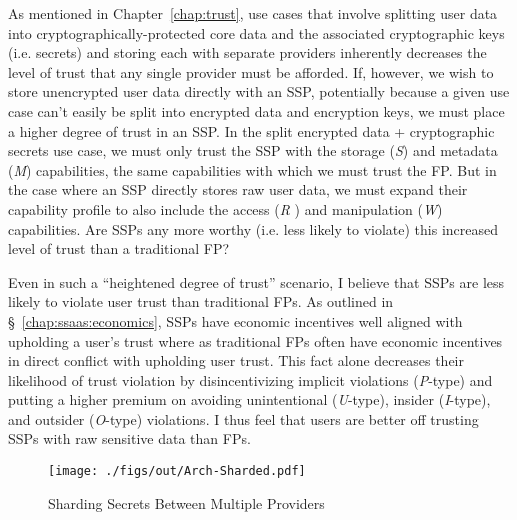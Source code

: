 As mentioned in Chapter~\ref{chap:trust}, use cases that involve
splitting user data into cryptographically-protected core data and the
associated cryptographic keys (i.e. secrets) and storing each with
separate providers inherently decreases the level of trust that any
single provider must be afforded. If, however, we wish to store
unencrypted user data directly with an SSP, potentially because a
given use case can't easily be split into encrypted data and
encryption keys, we must place a higher degree of trust in an SSP. In
the split encrypted data + cryptographic secrets use case, we must
only trust the SSP with the storage (\emph{S}) and metadata (\emph{M})
capabilities, the same capabilities with which we must trust the
FP. But in the case where an SSP directly stores raw user data, we
must expand their capability profile to also include the access
(\emph{R} ) and manipulation (\emph{W}) capabilities. Are SSPs any
more worthy (i.e. less likely to violate) this increased level of
trust than a traditional FP?

Even in such a ``heightened degree of trust'' scenario, I believe that
SSPs are less likely to violate user trust than traditional FPs. As
outlined in \S~\ref{chap:ssaas:economics}, SSPs have economic
incentives well aligned with upholding a user's trust where as
traditional FPs often have economic incentives in direct conflict with
upholding user trust. This fact alone decreases their likelihood of
trust violation by disincentivizing implicit violations
(\emph{P}-type) and putting a higher premium on avoiding unintentional
(\emph{U}-type), insider (\emph{I}-type), and outsider (\emph{O}-type)
violations. I thus feel that users are better off trusting SSPs with
raw sensitive data than FPs.

\begin{figure}[t]
  \centering
  \texttt{[image: ./figs/out/Arch-Sharded.pdf]}
  \caption{Sharding Secrets Between Multiple Providers}
  \label{fig:ssaas-sharded}
\end{figure}

